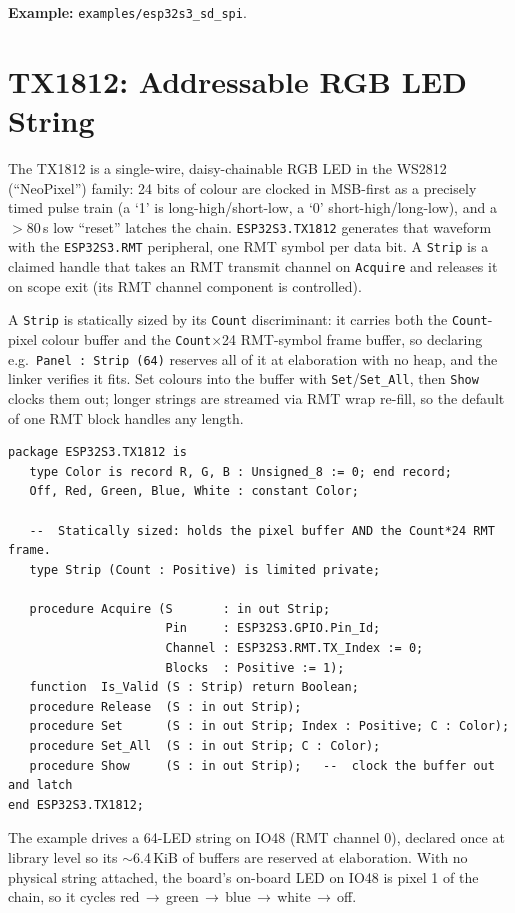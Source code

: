 \noindent\textbf{Example:} \texttt{examples/esp32s3\_sd\_spi}.

\section{TX1812: Addressable RGB LED String}
\label{app:ext:tx1812}

The TX1812 is a single-wire, daisy-chainable RGB LED in the WS2812 (``NeoPixel'')
family: 24 bits of colour are clocked in MSB-first as a precisely timed pulse train
(a `1' is long-high/short-low, a `0' short-high/long-low), and a $>$80\,\textmu s
low ``reset'' latches the chain. \texttt{ESP32S3.TX1812} generates that waveform
with the \texttt{ESP32S3.RMT} peripheral, one RMT symbol per data bit. A
\texttt{Strip} is a claimed handle that takes an RMT transmit channel on
\texttt{Acquire} and releases it on scope exit (its RMT channel component is
controlled).

A \texttt{Strip} is statically sized by its \texttt{Count} discriminant: it carries
both the \texttt{Count}-pixel colour buffer and the \texttt{Count}$\times$24
RMT-symbol frame buffer, so declaring e.g.\ \texttt{Panel : Strip (64)} reserves all
of it at elaboration with no heap, and the linker verifies it fits. Set colours into
the buffer with \texttt{Set}/\texttt{Set\_All}, then \texttt{Show} clocks them out;
longer strings are streamed via RMT wrap re-fill, so the default of one RMT block
handles any length.

\begin{lstlisting}
package ESP32S3.TX1812 is
   type Color is record R, G, B : Unsigned_8 := 0; end record;
   Off, Red, Green, Blue, White : constant Color;

   --  Statically sized: holds the pixel buffer AND the Count*24 RMT frame.
   type Strip (Count : Positive) is limited private;

   procedure Acquire (S       : in out Strip;
                      Pin     : ESP32S3.GPIO.Pin_Id;
                      Channel : ESP32S3.RMT.TX_Index := 0;
                      Blocks  : Positive := 1);
   function  Is_Valid (S : Strip) return Boolean;
   procedure Release  (S : in out Strip);
   procedure Set      (S : in out Strip; Index : Positive; C : Color);
   procedure Set_All  (S : in out Strip; C : Color);
   procedure Show     (S : in out Strip);   --  clock the buffer out and latch
end ESP32S3.TX1812;
\end{lstlisting}

The example drives a 64-LED string on IO48 (RMT channel 0), declared once at
library level so its $\sim$6.4\,KiB of buffers are reserved at elaboration. With no
physical string attached, the board's on-board LED on IO48 is pixel 1 of the chain,
so it cycles red\,$\rightarrow$\,green\,$\rightarrow$\,blue\,$\rightarrow$\,white\,$\rightarrow$\,off.

